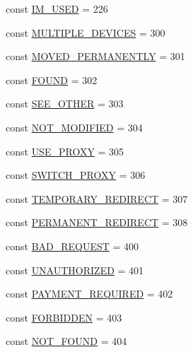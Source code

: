 \begin{DoxyCompactItemize}
\item 
const \hyperlink{classlibresignage_1_1api_1_1HTTPStatus_a9cd4c44823d893a33251dca97e534559}{I\+M\+\_\+\+U\+S\+ED} = 226
\item 
const \hyperlink{classlibresignage_1_1api_1_1HTTPStatus_a12065fbc306779482af6e21a3ab948c6}{M\+U\+L\+T\+I\+P\+L\+E\+\_\+\+D\+E\+V\+I\+C\+ES} = 300
\item 
const \hyperlink{classlibresignage_1_1api_1_1HTTPStatus_a36d0e8641b90b6203bd6589a6bbd0280}{M\+O\+V\+E\+D\+\_\+\+P\+E\+R\+M\+A\+N\+E\+N\+T\+LY} = 301
\item 
const \hyperlink{classlibresignage_1_1api_1_1HTTPStatus_a645a243f92e60bcd77db54354614c25e}{F\+O\+U\+ND} = 302
\item 
const \hyperlink{classlibresignage_1_1api_1_1HTTPStatus_af1b85b47a5ab7d514b427bbe8a4e6424}{S\+E\+E\+\_\+\+O\+T\+H\+ER} = 303
\item 
const \hyperlink{classlibresignage_1_1api_1_1HTTPStatus_a1ca0cc77cf47a729b10e340773fde193}{N\+O\+T\+\_\+\+M\+O\+D\+I\+F\+I\+ED} = 304
\item 
const \hyperlink{classlibresignage_1_1api_1_1HTTPStatus_a12ce79725ed09834ac3649ff6fb620a9}{U\+S\+E\+\_\+\+P\+R\+O\+XY} = 305
\item 
const \hyperlink{classlibresignage_1_1api_1_1HTTPStatus_adf6b262e5925494835ce73ff89b45e4a}{S\+W\+I\+T\+C\+H\+\_\+\+P\+R\+O\+XY} = 306
\item 
const \hyperlink{classlibresignage_1_1api_1_1HTTPStatus_a95de8b1b2d1cfcb2131c62712d601c15}{T\+E\+M\+P\+O\+R\+A\+R\+Y\+\_\+\+R\+E\+D\+I\+R\+E\+CT} = 307
\item 
const \hyperlink{classlibresignage_1_1api_1_1HTTPStatus_a3eee1c4e220bd8ab6e67082fd0fd9cd7}{P\+E\+R\+M\+A\+N\+E\+N\+T\+\_\+\+R\+E\+D\+I\+R\+E\+CT} = 308
\item 
const \hyperlink{classlibresignage_1_1api_1_1HTTPStatus_a1b4da7460fdde82ffafa3ddba815ddd3}{B\+A\+D\+\_\+\+R\+E\+Q\+U\+E\+ST} = 400
\item 
const \hyperlink{classlibresignage_1_1api_1_1HTTPStatus_a4aee01e1cf71db556059be6fea1180f9}{U\+N\+A\+U\+T\+H\+O\+R\+I\+Z\+ED} = 401
\item 
const \hyperlink{classlibresignage_1_1api_1_1HTTPStatus_a1b9524aba8e0387ac2ef503e86477be0}{P\+A\+Y\+M\+E\+N\+T\+\_\+\+R\+E\+Q\+U\+I\+R\+ED} = 402
\item 
const \hyperlink{classlibresignage_1_1api_1_1HTTPStatus_a6cd653980290b4bcea39bd99d34fc052}{F\+O\+R\+B\+I\+D\+D\+EN} = 403
\item 
const \hyperlink{classlibresignage_1_1api_1_1HTTPStatus_af7c50ff5f59779ae5f885af8c6d43cc8}{N\+O\+T\+\_\+\+F\+O\+U\+ND} = 404

\end{DoxyCompactItemize}
